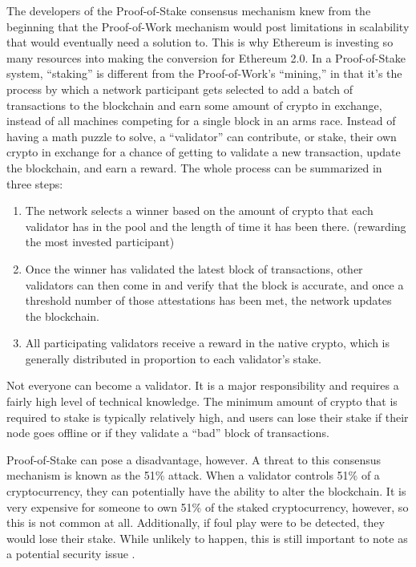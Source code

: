 The developers of the Proof-of-Stake consensus mechanism knew from the beginning that the Proof-of-Work mechanism would post limitations in scalability that would eventually need a solution to. This is  why Ethereum is investing so many resources into making the conversion for Ethereum 2.0. In a Proof-of-Stake system, “staking” is different from the Proof-of-Work’s “mining,” in that it’s the process by which a network participant gets selected to add a batch of transactions to the blockchain and earn some amount of crypto in exchange, instead of all machines competing for a single block in an arms race. Instead of having a math puzzle to solve, a “validator” can contribute, or stake, their own crypto in exchange for a chance of getting to validate a new transaction, update the blockchain, and earn a reward. The whole process can be summarized in three steps:
  \begin{enumerate}
    \item The network selects a winner based on the amount of crypto that each validator has in the pool and the length of time it has been there. (rewarding the most invested participant) 
    
    \item Once the winner has validated the latest block of transactions, other validators can then come in and verify that the block is accurate, and once a threshold number of those attestations has been met, the network updates the blockchain.
    
    \item All participating validators receive a reward in the native crypto, which is generally distributed in proportion to each validator’s stake. 
    
  \end{enumerate}	

Not everyone can become a validator. It is a major responsibility and requires a fairly high level of technical knowledge. The minimum amount of crypto that is required to stake is typically relatively high, and users can lose their stake if their node goes offline or if they validate a “bad” block of transactions. 

Proof-of-Stake can pose a disadvantage, however. A threat to this consensus mechanism is known as the 51\% attack. When a validator controls 51\% of a cryptocurrency, they can potentially have the ability to alter the blockchain. It is very expensive for someone to own 51\% of the staked cryptocurrency, however, so this is not common at all. Additionally, if foul play were to be detected, they would lose their stake. While unlikely to happen, this is still important to note as a potential security issue \cite{ethereum.org3}.

